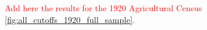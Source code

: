 \documentclass[11pt]{article}
\newcommand{\red}[1]{\textcolor{red}{#1}}
\begin{document}
\begin{comment}
Matching with the historical records, the results of \autoref{tab:land_1995_gini_All} indicate that municipalities with a grant are associated with a higher share of total agricultural land assigned to farms over 2000 hectares. 
In Panel A, even without any controls, a colonial land grant in a 1995 municipality is associated with a 3 percentage points increase in the share of farms over 2000 hectares. 
When adding controls or through the propensity score matching, the coefficient is stable and between 2.7 and 2.9. 

In Panel B, I break down the effects between the grants pre-1700 and post-1700.
When adding geographical controls or through the matching approach, the coefficients indicate that municipalities with grants pre-1700 are associated with a 3 to 4 percentage points increase in the share of farms over 2000 hectares in a municipality and post-1700 grants with a 2.3 to 2.8 percentage points increase. 
Consistent with the history that there was an imposed limit of 1698 on the size of the grants, the coefficient on the pre-1700 grants is higher than the post-1700 grants.

Further, all the results in Panel A and Panel B are of economic importance, since the mean of municipalities that did not receive a grant is 9 percentage points, indicating that historical land grants are associated with a 33 to 50\% increase in the share of large estates in a municipality.
The results of this section indicate that the grants are associated with a persistence in land inequality in Brazil.\footnote{\autoref{tab:ag_census_1995_varying_land} provides further results by varying the proportion of agricultural land above a certain cutoff. 
Instead of considering 2000 hectares and the main cutoff, I use cutoffs for both 5,000 and 10,000 hectares. 
Results are consistent throughout, with municipalities with a grant post-1700 having a higher proportion of lands above each cutoff. 
The coefficients vary between 1 and 2 percentage points depending on the estimation method.
Overall, the results are robust to different definitions of a large agricultural estate.}\textsuperscript{,}\footnote{Results for other cutoffs and how they vary by region can be found in
\autoref{fig:all_cutoffs_full_sample},
\autoref{fig:all_cutoffs_NE_sample},
\autoref{fig:all_cutoffs_SE_sample}.}
\end{comment} 

\red{Add here the results for the 1920 Agricultural Census \autoref{fig:all_cutoffs_1920_full_sample}.}
\end{document}
